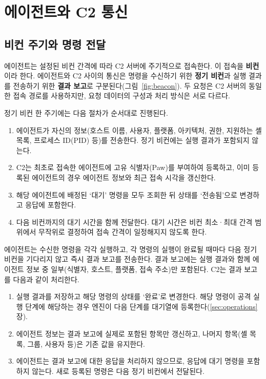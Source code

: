 \clearpage

\section{에이전트와 C2 통신}\label{sec:c2}

\subsection{비컨 주기와 명령 전달}\label{subsec:beacon}

에이전트는 설정된 비컨 간격에 따라 C2 서버에 주기적으로 접속한다. 이 접속을 \textbf{비컨}이라 한다.
에이전트와 C2 사이의 통신은 명령을 수신하기 위한 \textbf{정기 비컨}과 실행 결과를 전송하기 위한 \textbf{결과 보고}로 구분된다(그림~\ref{fig:beacon}).
두 요청은 C2 서버의 동일한 접속 경로를 사용하지만, 요청 데이터의 구성과 처리 방식은 서로 다르다.

정기 비컨 한 주기에는 다음 절차가 순서대로 진행된다.

\begin{enumerate}
    \item 에이전트가 자신의 정보(호스트 이름, 사용자, 플랫폼, 아키텍처, 권한, 지원하는 셸 목록, 프로세스 ID(PID) 등)를 전송한다. 정기 비컨에는 실행 결과가 포함되지 않는다.
    \item C2는 최초로 접속한 에이전트에 고유 식별자(Paw)를 부여하여 등록하고, 이미 등록된 에이전트의 경우 에이전트 정보와 최근 접속 시각을 갱신한다.
    \item 해당 에이전트에 배정된 `대기' 명령을 모두 조회한 뒤 상태를 `전송됨'으로 변경하고 응답에 포함한다.
    \item 다음 비컨까지의 대기 시간을 함께 전달한다. 대기 시간은 비컨 최소·최대 간격 범위에서 무작위로 결정하여 접속 간격이 일정해지지 않도록 한다.
\end{enumerate}

에이전트는 수신한 명령을 각각 실행하고, 각 명령의 실행이 완료될 때마다 다음 정기 비컨을 기다리지 않고 즉시 결과 보고를 전송한다.
결과 보고에는 실행 결과와 함께 에이전트 정보 중 일부(식별자, 호스트, 플랫폼, 접속 주소)만 포함된다.
C2는 결과 보고를 다음과 같이 처리한다.

\begin{enumerate}
    \item 실행 결과를 저장하고 해당 명령의 상태를 `완료'로 변경한다. 해당 명령이 공격 실행 단계에 해당하는 경우 엔진이 다음 단계를 대기열에 등록한다(\ref{sec:operations}장).
    \item 에이전트 정보는 결과 보고에 실제로 포함된 항목만 갱신하고, 나머지 항목(셸 목록, 그룹, 사용자 등)은 기존 값을 유지한다.
    \item 에이전트는 결과 보고에 대한 응답을 처리하지 않으므로, 응답에 대기 명령을 포함하지 않는다. 새로 등록된 명령은 다음 정기 비컨에서 전달된다.
\end{enumerate}

